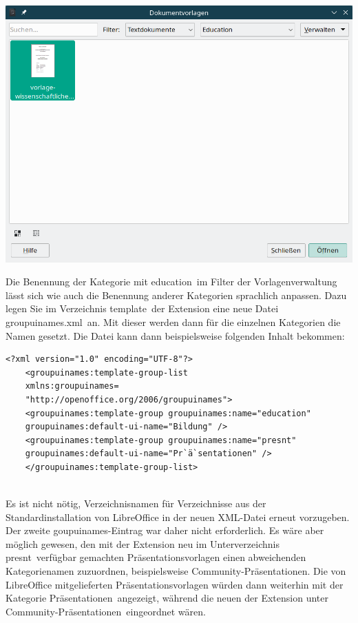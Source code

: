 \documentclass[12pt,a4paper,titlepage]{book}
\begin{document}
\begin{center}
	\captionsetup{type=figure}
	\includegraphics[width=0.9\linewidth]{pics/libo24_2_template_administration_dialog_with_new_template_section}
	\label{fig:template_administration_dialog_with_new_template_section}
\end{center}



Die Benennung der Kategorie mit \glqq education\grqq~im Filter der Vorlagenverwaltung lässt sich wie auch die Benennung anderer Kategorien sprachlich anpassen. Dazu legen Sie im Verzeichnis \glqq template\grqq~der Extension eine neue Datei \glqq groupuinames.xml\grqq~an. Mit dieser werden dann für die einzelnen Kategorien die Namen gesetzt. Die Datei kann dann beispielsweise folgenden Inhalt bekommen:

\begin{lstlisting}[language={[LaTeX]TeX},inputencoding={utf8},extendedchars=false, escapeinside=``]
	<?xml version="1.0" encoding="UTF-8"?>
	<groupuinames:template-group-list
	xmlns:groupuinames=
	"http://openoffice.org/2006/groupuinames">
	<groupuinames:template-group groupuinames:name="education"
	groupuinames:default-ui-name="Bildung" />
	<groupuinames:template-group groupuinames:name="presnt"
	groupuinames:default-ui-name="Pr`ä`sentationen" />
	</groupuinames:template-group-list>
	
\end{lstlisting}

Es ist nicht nötig, Verzeichnisnamen für Verzeichnisse aus der Standardinstallation von LibreOffice in der neuen XML-Datei erneut vorzugeben. Der zweite goupuinames-Eintrag war daher nicht erforderlich. Es wäre aber möglich gewesen, den mit der Extension neu im Unterverzeichnis \glqq presnt\grqq~verfügbar gemachten Präsentationsvorlagen einen abweichenden Kategorienamen zuzuordnen, beispielsweise \glqq Community-Präsentationen\grqq. Die von LibreOffice mitgelieferten Präsentationsvorlagen würden dann weiterhin mit der Kategorie \glqq Präsentationen\grqq~angezeigt, während die neuen der Extension unter \glqq Community-Präsentationen\grqq~eingeordnet wären.
\end{document}
